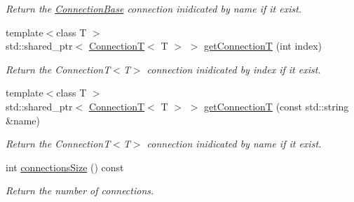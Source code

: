 \begin{DoxyCompactItemize}
\begin{DoxyCompactList}\small\item\em Return the \hyperlink{classcoco_1_1_connection_base}{Connection\+Base} connection inidicated by name if it exist. \end{DoxyCompactList}\item 
\hypertarget{classcoco_1_1_connection_manager_ae81d9b07af80bebc34b4472b221dea3e}{}{\footnotesize template$<$class T $>$ }\\std\+::shared\+\_\+ptr$<$ \hyperlink{classcoco_1_1_connection_t}{Connection\+T}$<$ T $>$ $>$ \hyperlink{classcoco_1_1_connection_manager_ae81d9b07af80bebc34b4472b221dea3e}{get\+Connection\+T} (int index)\label{classcoco_1_1_connection_manager_ae81d9b07af80bebc34b4472b221dea3e}

\begin{DoxyCompactList}\small\item\em Return the Connection\+T$<$\+T$>$ connection inidicated by index if it exist. \end{DoxyCompactList}\item 
\hypertarget{classcoco_1_1_connection_manager_a83fed8b43d70131be39f19d5e14023c7}{}{\footnotesize template$<$class T $>$ }\\std\+::shared\+\_\+ptr$<$ \hyperlink{classcoco_1_1_connection_t}{Connection\+T}$<$ T $>$ $>$ \hyperlink{classcoco_1_1_connection_manager_a83fed8b43d70131be39f19d5e14023c7}{get\+Connection\+T} (const std\+::string \&name)\label{classcoco_1_1_connection_manager_a83fed8b43d70131be39f19d5e14023c7}

\begin{DoxyCompactList}\small\item\em Return the Connection\+T$<$\+T$>$ connection inidicated by name if it exist. \end{DoxyCompactList}\item 
\hypertarget{classcoco_1_1_connection_manager_aec1d76fc41d101b85442df22fcb6690b}{}int \hyperlink{classcoco_1_1_connection_manager_aec1d76fc41d101b85442df22fcb6690b}{connections\+Size} () const \label{classcoco_1_1_connection_manager_aec1d76fc41d101b85442df22fcb6690b}

\begin{DoxyCompactList}\small\item\em Return the number of connections. \end{DoxyCompactList}\end{DoxyCompactItemize}
